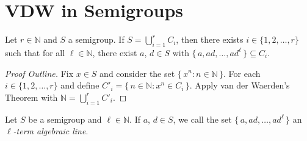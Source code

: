 \documentclass{beamer}
\newcommand{\bbN}{\mathbb{N}}
\begin{document}
\section{VDW in Semigroups}
\begin{frame}
  \begin{theorem}
    Let $r \in \bbN$ and $S$ a semigroup.
    If $S = \bigcup_{i=1}^r C_i$, then there exists $i \in \{1, 2,
    \ldots, r \}$ such that for all $\ell \in \bbN$, there exist $a$,
    $d \in S$ with $\{\, a, ad, \ldots, ad^\ell \,\} \subseteq C_i$. 
  \end{theorem}

  \pause

  \begin{proof}[Proof Outline]
    Fix $x \in S$ and consider the set $\{\, x^n : n \in \bbN \,\}$.
    For each $i \in \{1, 2, \ldots, r\}$ and define $C'_i = \{\, n \in
    \bbN : x^n \in C_i \,\}$. 
    Apply van der Waerden's Theorem with $\bbN = \bigcup_{i=1}^r C'_i$.
  \end{proof}

  \pause

  \begin{definition}
    Let $S$ be a semigroup and $\ell \in \bbN$. 
    If $a$, $d \in S$, we call the set $\{\, a, ad, \ldots, ad^\ell
    \,\}$ an \textsl{\mbox{$\ell$-term} algebraic line}.
  \end{definition}
\end{frame}
\end{document}
